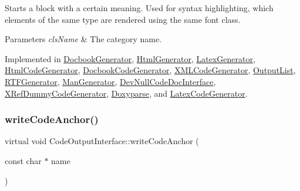 Starts a block with a certain meaning. Used for syntax highlighting, which elements of the same type are rendered using the same \textquotesingle{}font class\textquotesingle{}. 
\begin{DoxyParams}{Parameters}
{\em cls\+Name} & The category name. \\
\hline
\end{DoxyParams}


Implemented in \mbox{\hyperlink{class_docbook_generator_a899bafb067d2ad8cf7d834e23af83d91}{Docbook\+Generator}}, \mbox{\hyperlink{class_html_generator_aa600cc24896060a68612e3db6efb7dbf}{Html\+Generator}}, \mbox{\hyperlink{class_latex_generator_a8dc4dcc8aaa2a591a1fb7f06896cd5af}{Latex\+Generator}}, \mbox{\hyperlink{class_html_code_generator_ae7eaca4c34eeb6bf1aeaf0ac5ce4257b}{Html\+Code\+Generator}}, \mbox{\hyperlink{class_docbook_code_generator_ab39e3a862244d1c8926895d69240ca0d}{Docbook\+Code\+Generator}}, \mbox{\hyperlink{class_x_m_l_code_generator_aa6d0288952109fba1efe98d82e863b70}{X\+M\+L\+Code\+Generator}}, \mbox{\hyperlink{class_output_list_ace178947661035b39f4dc9076595c24f}{Output\+List}}, \mbox{\hyperlink{class_r_t_f_generator_a84114371fc0f3865e0321c2df8ce0ae9}{R\+T\+F\+Generator}}, \mbox{\hyperlink{class_man_generator_a4bafda26799458d289c507fad6690de9}{Man\+Generator}}, \mbox{\hyperlink{class_dev_null_code_doc_interface_a8489329a11f50e9d9ab1a3a67d306a51}{Dev\+Null\+Code\+Doc\+Interface}}, \mbox{\hyperlink{class_x_ref_dummy_code_generator_a5c53cb36c03f583b7b236e482a0a6693}{X\+Ref\+Dummy\+Code\+Generator}}, \mbox{\hyperlink{class_doxyparse_aa74b254b1e80ccf48d17acfa119e7704}{Doxyparse}}, and \mbox{\hyperlink{class_latex_code_generator_a46db28807c10d4fe78941dd0d907b73a}{Latex\+Code\+Generator}}.

\mbox{\label{class_code_output_interface_a1f6394c4ef7c4143de90bcaf3a65c0b4}} 
\subsubsection{\texorpdfstring{writeCodeAnchor()}{writeCodeAnchor()}}
{\footnotesize\ttfamily virtual void Code\+Output\+Interface\+::write\+Code\+Anchor (\begin{DoxyParamCaption}\item[{const char $\ast$}]{name }\end{DoxyParamCaption})\hspace{0.3cm}{\ttfamily [pure virtual]}}


